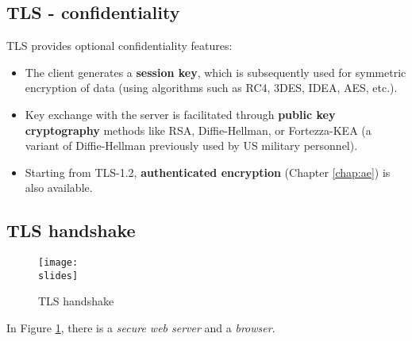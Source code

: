 \subsection{TLS - confidentiality}
TLS provides optional confidentiality features:

\begin{itemize}
    \item The client generates a \textbf{session key}, which is subsequently used for symmetric encryption of data (using algorithms such as RC4, 3DES, IDEA, AES, etc.).
    \item Key exchange with the server is facilitated through \textbf{public key cryptography} methods like RSA, Diffie-Hellman, or Fortezza-KEA (a variant of Diffie-Hellman previously used by US military personnel).
    \item Starting from TLS-1.2, \textbf{authenticated encryption} (Chapter \ref{chap:ae}) is also available.
\end{itemize}


\subsection{TLS handshake}
\begin{figure}[h]
    \centering
    \texttt{[image: \\slides]}
    \caption{TLS handshake}
    \label{fig:tls-handshake}
\end{figure}

In Figure \ref{fig:tls-handshake}, there is a \textit{secure web server} and a \textit{browser}.

